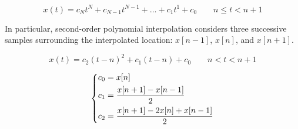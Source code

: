 \[
	x(t) = c_{N}t^{N} + c_{N-1}t^{N-1} + \dots + c_{1}t^{1} + c_{0} \qquad n \leq t< n + 1
\]

In particular, second-order polynomial interpolation considers three successive samples surrounding the interpolated location: $x[n-1]$, $x[n]$, and $x[n+1]$. 

\[
	x(t) = c_{2}(t-n)^{2} + c_{1}(t-n) + c_{0} \qquad n < t < n + 1
\]

\[
	\begin{dcases}
		c_{0} = x[n] \\
		c_{1} = \frac{x[n+1] - x[n-1]}{2} \\
		c_{2} = \frac{x[n+1] - 2 x[n] + x[n-1]}{2} 
	\end{dcases}
\]


